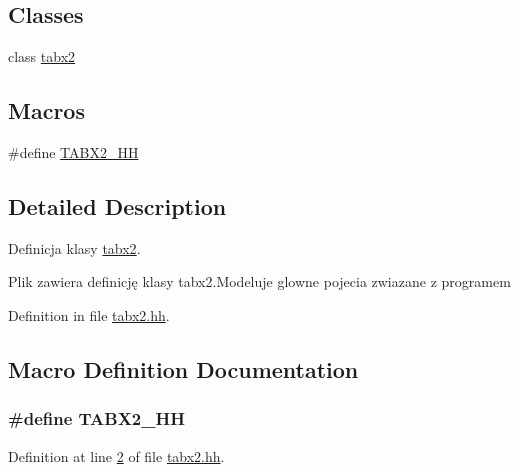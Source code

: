 \subsection*{Classes}
\begin{DoxyCompactItemize}
\item 
class \hyperlink{classtabx2}{tabx2}
\end{DoxyCompactItemize}
\subsection*{Macros}
\begin{DoxyCompactItemize}
\item 
\#define \hyperlink{tabx2_8hh_ab76bf9329c796034d3ea1300008f135e}{T\+A\+B\+X2\+\_\+\+H\+H}
\end{DoxyCompactItemize}


\subsection{Detailed Description}
Definicja klasy \hyperlink{classtabx2}{tabx2}. 

Plik zawiera definicję klasy tabx2.\+Modeluje glowne pojecia zwiazane z programem 

Definition in file \hyperlink{tabx2_8hh_source}{tabx2.\+hh}.



\subsection{Macro Definition Documentation}
\hypertarget{tabx2_8hh_ab76bf9329c796034d3ea1300008f135e}{}
\subsubsection[{T\+A\+B\+X2\+\_\+\+H\+H}]{\setlength{\rightskip}{0pt plus 5cm}\#define T\+A\+B\+X2\+\_\+\+H\+H}\label{tabx2_8hh_ab76bf9329c796034d3ea1300008f135e}


Definition at line \hyperlink{tabx2_8hh_source_l00002}{2} of file \hyperlink{tabx2_8hh_source}{tabx2.\+hh}.


